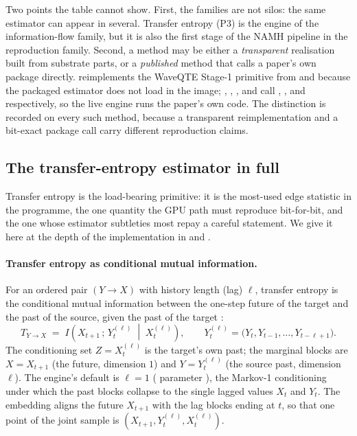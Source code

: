 Two points the table cannot show. First, the families are not silos: the same
estimator can appear in several. Transfer entropy (P3) is the engine of the
information-flow family, but it is also the first stage of the NAMH pipeline in the
reproduction family. Second, a method may be either a \emph{transparent} realisation
built from substrate parts, or a \emph{published} method that calls a paper's own
package directly.  reimplements the WaveQTE Stage-1 primitive from
 and  because the packaged estimator does not load
in the image; , ,
, and  call , ,
and  respectively, so the live engine runs the paper's own code. The
distinction is recorded on every such method, because a transparent reimplementation
and a bit-exact package call carry different reproduction claims.

\subsection{The transfer-entropy estimator in full}
\label{sec:ksg}

Transfer entropy is the load-bearing primitive: it is the most-used edge statistic in
the programme, the one quantity the GPU path must reproduce bit-for-bit, and the one
whose estimator subtleties most repay a careful statement. We give it here at the
depth of the implementation in  and .

\paragraph{Transfer entropy as conditional mutual information.}
For an ordered pair $(Y\to X)$ with history length (lag) $\ell$, transfer entropy is
the conditional mutual information between the one-step future of the target and the
past of the source, given the past of the target \citep{schreiber2000}:
\begin{equation}
\label{eq:te-cmi}
T_{Y\to X} \;=\; I\!\left(X_{t+1}\,;\, Y_t^{(\ell)} \;\middle|\; X_t^{(\ell)}\right),
\qquad
Y_t^{(\ell)} = \bigl(Y_t, Y_{t-1}, \dots, Y_{t-\ell+1}\bigr).
\end{equation}
The conditioning set $Z = X_t^{(\ell)}$ is the target's own past; the marginal blocks
are $X = X_{t+1}$ (the future, dimension $1$) and $Y = Y_t^{(\ell)}$ (the source past,
dimension $\ell$). The engine's default is $\ell=1$ ( parameter
), the Markov-1 conditioning under which the past blocks collapse to the
single lagged values $X_t$ and $Y_t$. The embedding aligns the future $X_{t+1}$ with
the lag blocks ending at $t$, so that one point of the joint sample is
$(X_{t+1}, Y_t^{(\ell)}, X_t^{(\ell)})$.

